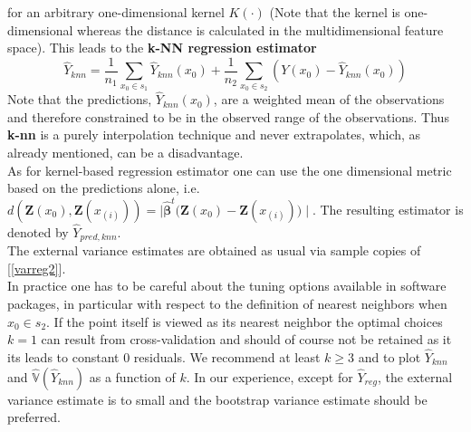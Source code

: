 \documentclass[a4paper,12pt,leqno, titlepage]{article}
\newcommand{\VAR}{\mathbb{V}}
\begin{document}
for an arbitrary one-dimensional kernel $K(\cdot)$ (Note that the kernel is one-dimensional whereas the distance is calculated in the multidimensional feature space). This leads to the \textbf{k-NN regression estimator}
\begin{equation}\label{knnreg}
\hat{Y}_{knn}=\frac{1}{n_1}\sum_{x_0\in{s_1}}\hat{Y}_{knn}(x_0)+
\frac{1}{n_2}\sum_{x_0\in{s_2}}(Y(x_0)-\hat{Y}_{knn}(x_0))
\end{equation}
Note that the predictions, $\hat{Y}_{knn}(x_0)$, are a weighted mean of the observations and therefore constrained to be in the observed range of the observations. Thus \textbf{k-nn} is a purely interpolation technique and never extrapolates, which, as already mentioned, can be a disadvantage.\\
As for kernel-based regression estimator one can use the one dimensional metric based on the predictions alone, i.e. $d(\pmb{Z}(x_0),\pmb{Z}(x_{(i)}))=\mid \hat{\pmb{\beta}}^t\big(\pmb{Z}(x_0)-\pmb{Z}(x_{(i)})\big)\mid$. The resulting estimator is denoted by
$\hat{Y}_{pred,knn}$.\\
The external variance estimates are obtained as usual via sample copies of [\ref{varreg2}].\\
In practice one has to be careful about the tuning options available in software packages, in particular
with respect to the definition of nearest neighbors when $x_0\in{s_2}$. If the point itself is viewed as its nearest neighbor the optimal choices $k=1$ can result from cross-validation and should of course not be retained as it its leads to constant $0$ residuals. We recommend at least $k \ge 3$ and to plot $\hat{Y}_{knn}$ and $\hat{\VAR}(\hat{Y}_{knn})$ as a function of $k$. In our experience, except for $\hat{Y}_{reg}$, the external variance estimate is to small and the bootstrap variance estimate should be preferred.
\clearpage\newpage
\end{document}
